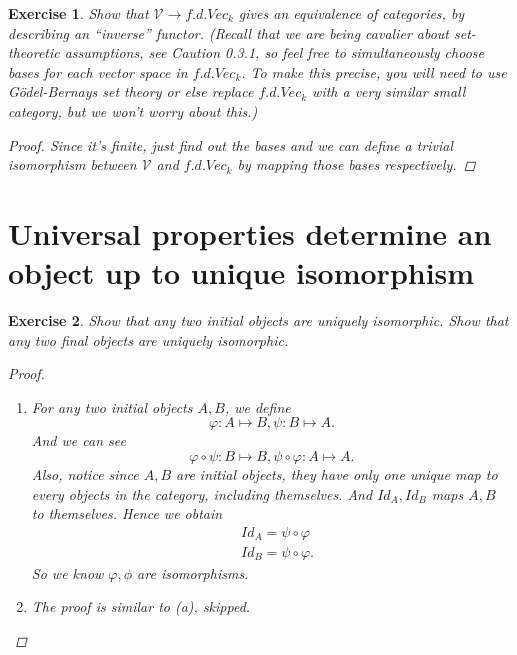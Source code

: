 \documentclass{article}
\theoremstyle{breakstyle}
\newtheorem{exercise}{Exercise}[section]
\begin{document}
\begin{exercise}
Show that $\mathcal{V} \rightarrow f.d.Vec_{k}$ gives an equivalence of
categories, by describing an ``inverse'' functor. (Recall that we are being
cavalier about set-theoretic assumptions, see Caution 0.3.1, so feel free to
simultaneously choose bases for each vector space in $f.d.Vec_{k}$. To make
this precise, you will need to use G\"{o}del-Bernays set theory or else
replace $f.d.Vec_{k}$ with a very similar small category, but we won't worry
about this.)

\begin{proof}
    Since it's finite, just find out the bases and we can define a trivial
    isomorphism between $\mathscr{V}$ and $f.d.Vec_{k}$ by mapping those bases
    respectively.
\end{proof}

\end{exercise}

\section{Universal properties determine an object up to unique isomorphism}
\begin{exercise}
Show that any two initial objects are uniquely isomorphic. Show that any two
final objects are uniquely isomorphic.

\begin{proof}
	\begin{enumerate}
		\item For any two initial objects $A,B$, we define
			 $$
			\varphi: A\mapsto B,\psi: B\mapsto A
			.$$ 
			And we can see 
			$$
			\varphi \circ \psi :B\mapsto B,\psi\circ\varphi:A\mapsto A
			.$$ 
            Also, notice since $A,B$ are initial objects, they have only one
            unique map to every objects in the category, including themselves.
            And $Id_{A},Id_{B}$ maps $A,B$ to themselves. Hence we obtain
			\begin{align*}
				& Id_{A}=\psi\circ\varphi \\
				& Id_{B}=\psi\circ\varphi
			.\end{align*}
			So we know $\varphi,\phi$ are isomorphisms.
		\item The proof is similar to \emph{(a)}, skipped.
	\end{enumerate}
\end{proof}

\end{exercise}
\end{document}
